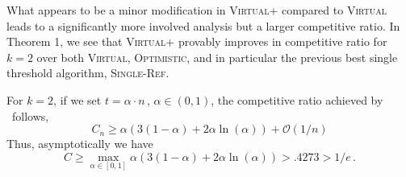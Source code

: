 What appears to be a minor modification in \textsc{Virtual+} compared to \textsc{Virtual} leads to a significantly more involved analysis but a larger competitive ratio. In Theorem 1, we see that \textsc{Virtual+} provably improves in competitive ratio for $k=2$ over both \textsc{Virtual}, \textsc{Optimistic}, and in particular the previous best single threshold algorithm, \textsc{Single-Ref}.



\begin{theorem} For $k=2$, if we set $t= \alpha \cdot n\,,\, \alpha \in (0,1)$, the competitive ratio achieved by \algoname\ follows,
\begin{equation} \label{eq:lower_bound_alpha}
    C_n \geq \alpha ( 3(1-\alpha) + 2 \alpha \ln(\alpha)) + \mathcal{O}(1/n)
\end{equation}
Thus, asymptotically  we have
\begin{equation}
    C \geq  \max_{\alpha \in [0,1]} \alpha ( 3(1-\alpha) + 2 \alpha \ln(\alpha)) > .4273 > 1/e \, .
\end{equation}
\label{thm:K_2_theorem1}
\end{theorem}
